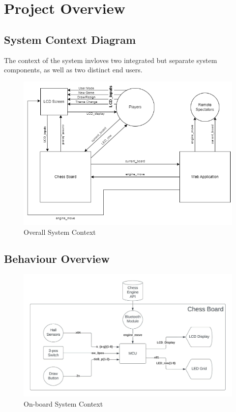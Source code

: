 \documentclass[12pt]{article}
\begin{document}
\section{Project Overview}
\projectoverview

\subsection{System Context Diagram}

    The context of the system invloves two integrated but separate system components, as well as two distinct end users.

\begin{figure}[H]
  \begin{center}
    \includegraphics[scale=0.65]{chess-connect-system-context.png}
    \caption{Overall System Context}
    \label{Fig_SystemContext} 
  \end{center}
\end{figure}

\subsection{Behaviour Overview}
\begin{figure}[H]
    \begin{center}
      \includegraphics[scale=0.8]{Hardware_System_Context_Diagram.jpeg}
      \caption{On-board System Context}
      \label{Fig_SystemContext2} 
    \end{center}
  \end{figure}
\end{document}
